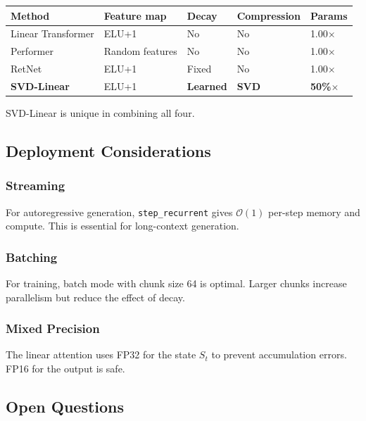\begin{table}[H]
\centering
\small
\begin{tabular}{lllll}
\toprule
\textbf{Method} & \textbf{Feature map} & \textbf{Decay} & \textbf{Compression} & \textbf{Params} \\
\midrule
Linear Transformer & ELU+1 & No & No & 1.00$\times$ \\
Performer & Random features & No & No & 1.00$\times$ \\
RetNet & ELU+1 & Fixed & No & 1.00$\times$ \\
\textbf{SVD-Linear} & ELU+1 & \textbf{Learned} & \textbf{SVD} & \textbf{50\%$\times$} \\
\bottomrule
\end{tabular}
\end{table}

SVD-Linear is unique in combining all four.

\subsection{Deployment Considerations}

\subsubsection{Streaming}

For autoregressive generation, \texttt{step\_recurrent} gives $\mathcal{O}(1)$ 
per-step memory and compute. This is essential for long-context generation.

\subsubsection{Batching}

For training, batch mode with chunk size 64 is optimal. Larger chunks 
increase parallelism but reduce the effect of decay.

\subsubsection{Mixed Precision}

The linear attention uses FP32 for the state $S_t$ to prevent accumulation 
errors. FP16 for the output is safe.

\subsection{Open Questions}

